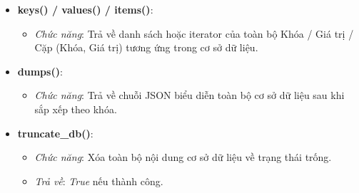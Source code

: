 \documentclass[12pt,a4paper]{report}
\begin{document}
\begin{itemize}
    \item \textbf{keys() / values() / items()}:
        \begin{itemize}
            \item \textit{Chức năng}: Trả về danh sách hoặc iterator của toàn bộ Khóa / Giá trị / Cặp (Khóa, Giá trị) tương ứng trong cơ sở dữ liệu.
        \end{itemize}
    \item \textbf{dumps()}:
        \begin{itemize}
            \item \textit{Chức năng}: Trả về chuỗi JSON biểu diễn toàn bộ cơ sở dữ liệu sau khi sắp xếp theo khóa.
        \end{itemize}
    \item \textbf{truncate\_db()}:
        \begin{itemize}
            \item \textit{Chức năng}: Xóa toàn bộ nội dung cơ sở dữ liệu về trạng thái trống.
            \item \textit{Trả về}: \textit{True} nếu thành công.
        \end{itemize}
\end{itemize}
\end{document}
